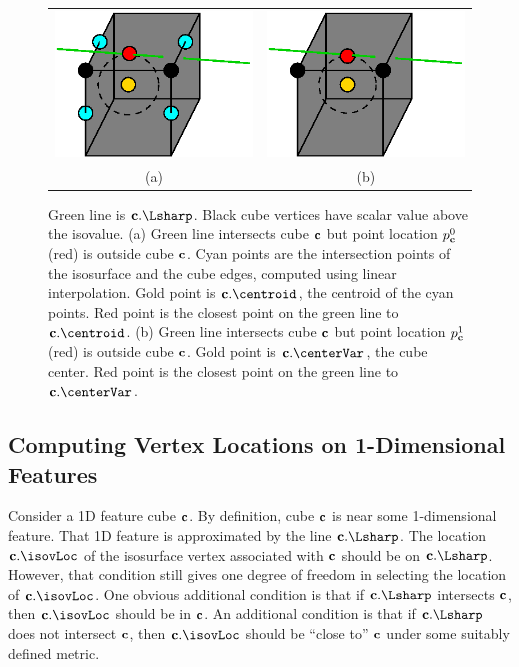 \begin{figure}[t]
\centering

\begin{tabular}{cc}
\includegraphics[width=0.4\linewidth]{images/centroid.eps} \qquad &
\qquad
\includegraphics[width=0.4\linewidth]{images/center.eps} \\
(a) & (b)
\end{tabular}

\caption{Green line is $\cb.\protect\Lsharp$.
Black cube vertices have scalar value above the isovalue.
(a) Green line intersects cube $\mathbf{c}$
but point location $p^0_{\mathbf{c}}$ (red) is outside cube $\mathbf{c}$.
Cyan points are the intersection points of the isosurface
and the cube edges, computed using linear interpolation.
Gold point is $\cb.\protect\centroid$, the centroid of the cyan points.
Red point is the closest point on the green line to $\cb.\protect\centroid$.
(b) Green line intersects cube $\mathbf{c}$
but point location $p^1_{\mathbf{c}}$ (red) is outside cube $\mathbf{c}$.
Gold point is $\cb.\protect\centerVar$, the cube center.
Red point is the closest point on the green line to $\cb.\protect\centerVar$.
}
\label{fig:out_of_cube}
\end{figure}

\subsection{Computing Vertex Locations on 1-Dimensional Features}

Consider a 1D feature cube $\mathbf{c}$.
By definition, cube $\mathbf{c}$ is near some 1-dimensional feature.
That 1D feature is approximated by the line $\cb.\Lsharp$.
The location $\cb.\isovLoc$ of the isosurface vertex associated with $\mathbf{c}$ 
should be on $\cb.\Lsharp$.
However, that condition still gives one degree of freedom in selecting
the location of $\cb.\isovLoc$.
One obvious additional condition is that if $\cb.\Lsharp$ intersects $\mathbf{c}$,
then $\cb.\isovLoc$ should be in $\mathbf{c}$.
An additional condition is that if $\cb.\Lsharp$ does not intersect $\mathbf{c}$,
then $\cb.\isovLoc$ should be ``close to'' $\mathbf{c}$ 
under some suitably defined metric.

